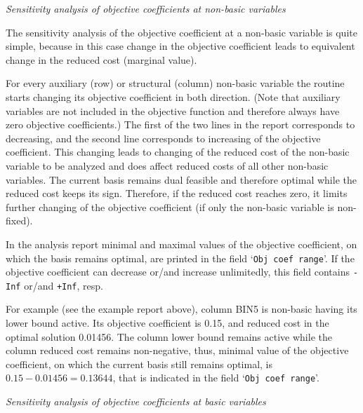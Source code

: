 \noindent
{\it Sensitivity analysis of objective coefficients at non-basic
variables}

The sensitivity analysis of the objective coefficient at a non-basic
variable is quite simple, because in this case change in the objective
coefficient leads to equivalent change in the reduced cost (marginal
value).

For every auxiliary (row) or structural (column) non-basic variable the
routine starts changing its objective coefficient in both direction.
(Note that auxiliary variables are not included in the objective
function and therefore always have zero objective coefficients.) The
first of the two lines in the report corresponds to decreasing, and the
second line corresponds to increasing of the objective coefficient.
This changing leads to changing of the reduced cost of the non-basic
variable to be analyzed and does affect reduced costs of all other
non-basic variables. The current basis remains dual feasible and
therefore optimal while the reduced cost keeps its sign. Therefore, if
the reduced cost reaches zero, it limits further changing of the
objective coefficient (if only the non-basic variable is non-fixed).

In the analysis report minimal and maximal values of the objective
coefficient, on which the basis remains optimal, are printed in the
field `\verb|Obj coef range|'. If the objective coefficient can
decrease or/and increase unlimitedly, this field contains {\tt -Inf}
or/and {\tt +Inf}, resp.

For example (see the example report above), column BIN5 is non-basic
having its lower bound active. Its objective coefficient is 0.15, and
reduced cost in the optimal solution 0.01456. The column lower bound
remains active while the column reduced cost remains non-negative,
thus, minimal value of the objective coefficient, on which the current
basis still remains optimal, is $0.15-0.01456=0.13644$, that is
indicated in the field `\verb|Obj coef range|'.


\noindent
{\it Sensitivity analysis of objective coefficients at basic variables}


